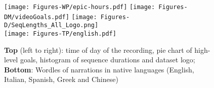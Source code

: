 \documentclass[runningheads]{llncs}
\begin{document}
\begin{figure}[t]
\texttt{[image: Figures-WP/epic-hours.pdf]}
\texttt{[image: Figures-DM/videoGoals.pdf]}
\texttt{[image: Figures-D/SeqLengths\_All\_Logo.png]}\\
{\texttt{[image: Figures-TP/english.pdf]}}
\vspace{-2mm}
\caption{{\bf Top} (left to right): time of day of the recording, pie chart of high-level goals, histogram of sequence durations and dataset logo; {\bf Bottom}: Wordles of narrations in native languages (English, Italian, Spanish, Greek and Chinese)}
\label{fig:statsCollect}
\vspace{-3mm}
\end{figure}
\end{document}
